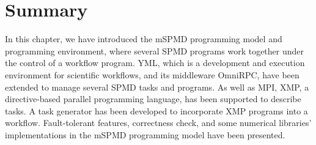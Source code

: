 \documentclass[graybox]{svmult}
\begin{document}
\section{Summary}

In this chapter, we have introduced the mSPMD programming model and programming environment, where several SPMD programs work together under the control of a workflow program. YML, which is a development and execution environment for scientific workflows, and its middleware OmniRPC, have been extended to manage several SPMD tasks and programs. 
As well as MPI, XMP, a directive-based parallel programming language, has been supported to describe tasks. 
A task generator has been developed to incorporate XMP programs into a workflow. 
Fault-tolerant features, correctness check, and some numerical libraries' implementations in the mSPMD programming model have been presented. 


% 
%
\end{document}
